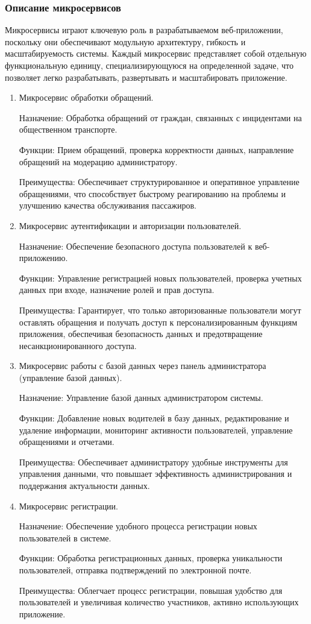 \subsubsection{Описание микросервисов}
Микросервисы играют ключевую роль в разрабатываемом веб-приложении, поскольку они обеспечивают модульную архитектуру, гибкость и масштабируемость системы. Каждый микросервис представляет собой отдельную функциональную единицу, специализирующуюся на определенной задаче, что позволяет легко разрабатывать, развертывать и масштабировать приложение.
\begin{enumerate}
	\item Микросервис обработки обращений.
	
	Назначение: Обработка обращений от граждан, связанных с инцидентами на общественном транспорте.
	
	Функции: Прием обращений, проверка корректности данных, направление обращений на модерацию администратору.
	
	Преимущества: Обеспечивает структурированное и оперативное управление обращениями, что способствует быстрому реагированию на проблемы и улучшению качества обслуживания пассажиров.
	
	\item Микросервис аутентификации и авторизации пользователей.
	
	Назначение: Обеспечение безопасного доступа пользователей к веб-приложению.
	
	Функции: Управление регистрацией новых пользователей, проверка учетных данных при входе, назначение ролей и прав доступа.
	
	Преимущества: Гарантирует, что только авторизованные пользователи могут оставлять обращения и получать доступ к персонализированным функциям приложения, обеспечивая безопасность данных и предотвращение несанкционированного доступа.
	
	\item Микросервис работы с базой данных через панель администратора (управление базой данных).
	
	Назначение: Управление базой данных администратором системы.
	
	Функции: Добавление новых водителей в базу данных, редактирование и удаление информации, мониторинг активности пользователей, управление обращениями и отчетами.
	
	Преимущества: Обеспечивает администратору удобные инструменты для управления данными, что повышает эффективность администрирования и поддержания актуальности данных.
	
	\item Микросервис регистрации.
	
	Назначение: Обеспечение удобного процесса регистрации новых пользователей в системе.
	
	Функции: Обработка регистрационных данных, проверка уникальности пользователей, отправка подтверждений по электронной почте.
	
	Преимущества: Облегчает процесс регистрации, повышая удобство для пользователей и увеличивая количество участников, активно использующих приложение.
\end{enumerate}

